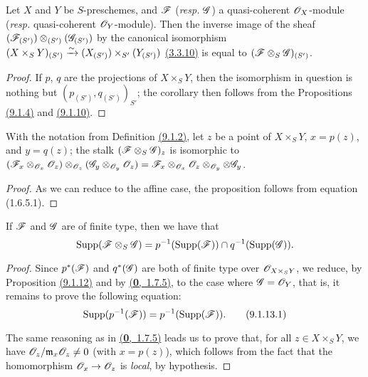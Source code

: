 \begin{cor}[9.1.11]
\label{cor-1.9.1.11}
Let $X$ and $Y$ be $S$-preschemes, and
$\mathscr{F}$ ({\em resp.} $\mathscr{G}$) a quasi-coherent $\mathscr{O}_X$-module
({\em resp.} quasi-coherent $\mathscr{O}_Y$-module). Then the inverse image of the sheaf
$(\mathscr{F}_{(S')})\otimes_{(S')}(\mathscr{G}_{(S')})$ by the canonical isomorphism
$(X\times_S Y)_{(S')}\xrightarrow{\sim}(X_{(S')})\times_{S'}(Y_{(S')})$
\hyperref[cor-1.3.3.10]{(3.3.10)} is equal to $(\mathscr{F}\otimes_S\mathscr{G})_{(S')}$.
\end{cor}

\begin{proof}
\label{proof-cor-1.9.1.11}
If $p$, $q$ are the projections of $X\times_S Y$, then the isomorphism in question
is nothing but $(p_{(S')}, q_{(S')})_{S'}$; the corollary then follows from the
Propositions \hyperref[prop-1.9.1.4]{(9.1.4)} and \hyperref[prop-1.9.1.10]{(9.1.10)}.
\end{proof}

\begin{prop}[9.1.12]
\label{prop-1.9.1.12}
With the notation from Definition \hyperref[defn-1.9.1.2]{(9.1.2)}, let $z$ be
a point of $X\times_S Y$, $x=p(z)$, and $y=q(z)$; the stalk
$(\mathscr{F}\otimes_S\mathscr{G})_z$ is isomorphic to
$(\mathscr{F}_x\otimes_{\mathscr{O}_x}\mathscr{O}_z)\otimes_{\mathscr{O}_z}(\mathscr{G}_y\otimes_{\mathscr{O}_y}\mathscr{O}_z)
  =\mathscr{F}_x\otimes_{\mathscr{O}_x}\mathscr{O}_z\otimes_{\mathscr{O}_y}\otimes\mathscr{G}_y$.
\end{prop}

\begin{proof}
\label{proof-prop-1.9.1.12}
As we can reduce to the affine case, the proposition follows from
equation (1.6.5.1).
\end{proof}

\begin{cor}[9.1.13]
\label{cor-1.9.1.13}
If $\mathscr{F}$ and $\mathscr{G}$ are of finite type, then we have that
\[
  {\mathop{\mathrm{Supp}}\nolimits}(\mathscr{F}\otimes_S\mathscr{G})=p^{-1}({\mathop{\mathrm{Supp}}\nolimits}(\mathscr{F}))\cap q^{-1}({\mathop{\mathrm{Supp}}\nolimits}(\mathscr{G})).
\]
\end{cor}

\begin{proof}
\label{proof-cor-1.9.1.13}
Since $p^*(\mathscr{F})$ and $q^*(\mathscr{G})$ are both of finite type over
$\mathscr{O}_{X\times_S Y}$, we reduce, by Proposition \hyperref[prop-1.9.1.12]{(9.1.12)} and
by \hyperref[env-0.1.7.5]{(\textbf{0},~1.7.5)}, to the case where $\mathscr{G}=\mathscr{O}_Y$, that
is, it remains to prove the following equation:
\[
  {\mathop{\mathrm{Supp}}\nolimits}(p^{-1}(\mathscr{F}))=p^{-1}({\mathop{\mathrm{Supp}}\nolimits}(\mathscr{F})).
  \tag{9.1.13.1}
\]

The same reasoning as in \hyperref[env-0.1.7.5]{(\textbf{0},~1.7.5)} leads us to prove that, for all
$z\in X\times_S Y$, we have $\mathscr{O}_z/\mathfrak{m}_x\mathscr{O}_z\neq0$ (with $x=p(z)$),
which follows from the fact that the homomorphism $\mathscr{O}_x\to\mathscr{O}_z$ is {\em local},
by hypothesis.
\end{proof}

